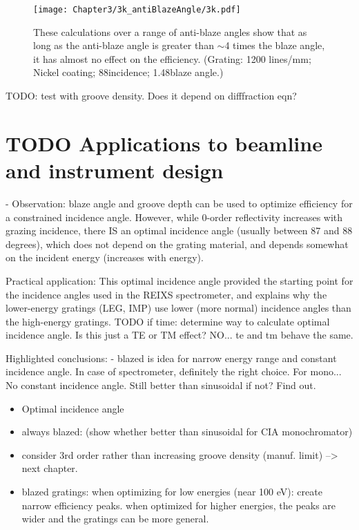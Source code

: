 \begin{figure}[htbp] %
   \centering
   \texttt{[image: Chapter3/3k\_antiBlazeAngle/3k.pdf]} 
   \caption[These calculations over a range of anti-blaze angles show that as long as the anti-blaze angle is greater than $\sim$4 times the blaze angle, it has almost no effect on the efficiency.]{These calculations over a range of anti-blaze angles show that as long as the anti-blaze angle is greater than $\sim$4 times the blaze angle, it has almost no effect on the efficiency.  (Grating: 1200 lines/mm; Nickel coating; 88\dg incidence; 1.48\dg blaze angle.)}
   \label{3k}
\end{figure}

TODO: test with groove density. Does it depend on difffraction eqn?
	
\section{TODO Applications to beamline and instrument design}
	- Observation: blaze angle and groove depth can be used to optimize efficiency for a constrained incidence angle.  However, while 0-order reflectivity increases with grazing incidence, there IS an optimal incidence angle (usually between 87 and 88 degrees), which does not depend on the grating material, and depends somewhat on the incident energy (increases with energy).  
	
	Practical application: This optimal incidence angle provided the starting point for the incidence angles used in the REIXS spectrometer, and explains why the lower-energy gratings (LEG, IMP) use lower (more normal) incidence angles than the high-energy gratings.
	TODO if time: determine way to calculate optimal incidence angle.  Is this just a TE or TM effect? NO... te and tm behave the same.
	
	
Highlighted conclusions:
	- blazed is idea for narrow energy range and constant incidence angle.  In case of spectrometer, definitely the right choice.  For mono... No constant incidence angle.  Still better than sinusoidal if not?  Find out.
	
\begin{itemize}
\item Optimal incidence angle
\item always blazed: (show whether better than sinusoidal for CIA monochromator)
\item consider 3rd order rather than increasing groove density (manuf. limit) --> next chapter.
\item blazed gratings: when optimizing for low energies (near 100 eV): create narrow efficiency peaks. when optimized for higher energies, the peaks are wider and the gratings can be more general.
\end{itemize}

